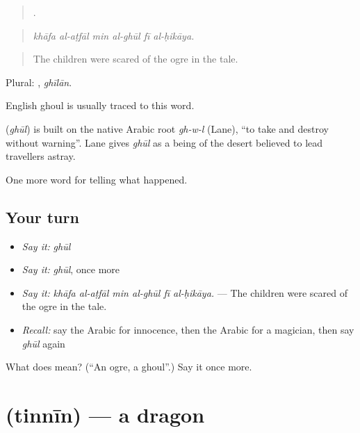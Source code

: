 \begin{quote}
     .
\end{quote}

\begin{quote}
\emph{khāfa al-aṭfāl min al-ghūl fī al-ḥikāya.}
\end{quote}

\begin{quote}
The children were scared of the ogre in the tale.
\end{quote}

Plural: , \emph{ghīlān}.

English ghoul is usually traced to this word.

\begin{cousinweb}
\textbf{} (\emph{ghūl}) is built on the native Arabic root \emph{gh-w-l} (Lane), \textquotedblleft{}to take and destroy without warning\textquotedblright{}. Lane gives \emph{ghūl} as a being of the desert believed to lead travellers astray.
\end{cousinweb}

\begin{grammarlens}[title={What you've built}]
One more word for telling what happened.
\end{grammarlens}

\subsection*{Your turn}
\begin{itemize}
\raggedright
  \item \emph{Say it:} \emph{ghūl}
  \item \emph{Say it:} \emph{ghūl}, once more
  \item \emph{Say it:} \emph{khāfa al-aṭfāl min al-ghūl fī al-ḥikāya.} — The children were scared of the ogre in the tale.
  \item \emph{Recall:} say the Arabic for innocence, then the Arabic for a magician, then say \emph{ghūl} again
\end{itemize}

\begin{tcolorbox}[breakable,colback=teal!4,colframe=teal!35!black,title={Before you move on}]
What does  mean? (\textquotedblleft{}An ogre, a ghoul\textquotedblright{}.) Say it once more.
\end{tcolorbox}
\section[\texorpdfstring{\ar{تنين} (tinnīn)}{تنين (tinnīn)}]{ (tinnīn) — a dragon}

